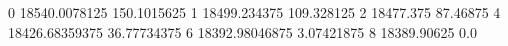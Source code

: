 0 18540.0078125 150.1015625
1 18499.234375 109.328125
2 18477.375 87.46875
4 18426.68359375 36.77734375
6 18392.98046875 3.07421875
8 18389.90625 0.0
